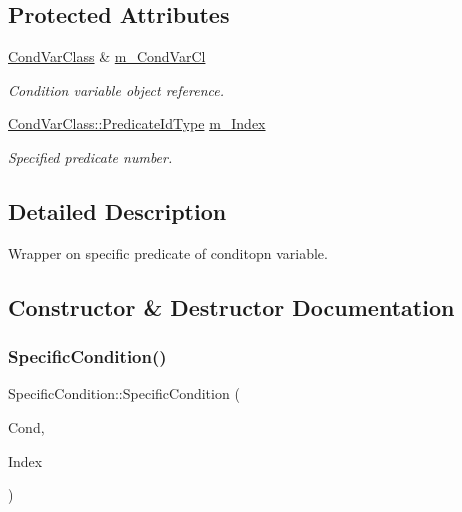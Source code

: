 \subsection*{Protected Attributes}
\begin{DoxyCompactItemize}
\item 
\hyperlink{classCondVarClass}{Cond\+Var\+Class} \& \hyperlink{classSpecificCondition_af686c95919169acecede46f1821e1660}{m\+\_\+\+Cond\+Var\+Cl}
\begin{DoxyCompactList}\small\item\em Condition variable object reference. \end{DoxyCompactList}\item 
\hyperlink{classCondVarClass_a8e27f99972b8b95f064d6657a4583a5b}{Cond\+Var\+Class\+::\+Predicate\+Id\+Type} \hyperlink{classSpecificCondition_a9de96adba4d7b9347d2ae60a49b57d9b}{m\+\_\+\+Index}
\begin{DoxyCompactList}\small\item\em Specified predicate number. \end{DoxyCompactList}\end{DoxyCompactItemize}


\subsection{Detailed Description}
Wrapper on specific predicate of conditopn variable. 

\subsection{Constructor \& Destructor Documentation}
\mbox{\label{classSpecificCondition_aeaad30c2483d565580a0c5def33a56bf}} 
\subsubsection{\texorpdfstring{Specific\+Condition()}{SpecificCondition()}}
{\footnotesize\ttfamily Specific\+Condition\+::\+Specific\+Condition (\begin{DoxyParamCaption}\item[{\hyperlink{classCondVarClass}{Cond\+Var\+Class} \&}]{Cond,  }\item[{\hyperlink{classCondVarClass_a8e27f99972b8b95f064d6657a4583a5b}{Cond\+Var\+Class\+::\+Predicate\+Id\+Type}}]{Index }\end{DoxyParamCaption})\hspace{0.3cm}{\ttfamily [noexcept]}}

